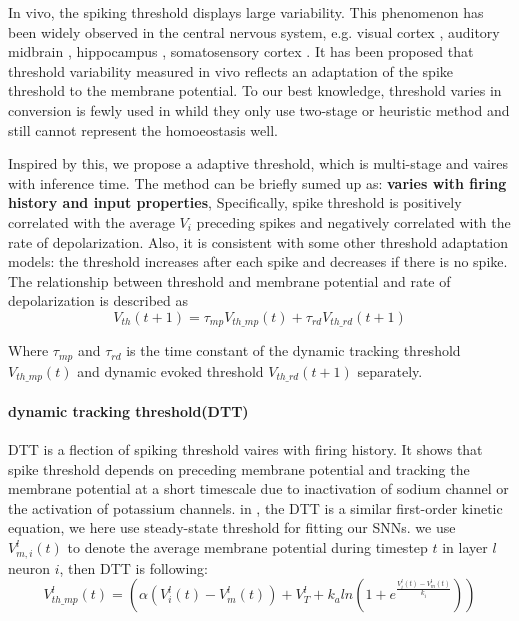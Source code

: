\documentclass{article}
\begin{document}
In vivo, the spiking threshold displays large variability. This phenomenon has been widely observed in
the central nervous system, e.g. visual cortex \cite{azouz2000dynamic, azouz2003adaptive}, auditory
midbrain \cite{pena2002postsynaptic}, hippocampus \cite{henze2001action}, somatosensory cortex \cite{wilent2005stimulus}. It has
been proposed that threshold variability measured in vivo reflects
an adaptation of the spike threshold to the membrane potential. To our best knowledge, threshold varies in conversion is fewly used in \cite{kim2020towards,chen2022adaptive,li2021free} whild they only use two-stage or heuristic method and still cannot represent the homoeostasis well.

Inspired by this, we propose a adaptive threshold, which is multi-stage and vaires with inference time.
The method can be briefly sumed up as: \textbf{varies with firing history and input properties},
Specifically, spike threshold is positively correlated with the average $V_i$ preceding spikes and negatively correlated with the rate of depolarization. Also, it is consistent with some
other threshold adaptation models: the threshold increases after each spike and decreases if there is no spike.
The relationship between threshold and membrane potential and rate of depolarization is described as
\begin{equation}
  V_{th}(t+1) = \tau_{mp}V_{th\_mp}(t) + \tau_{rd}V_{th\_rd}(t+1)
\end{equation}

Where $\tau_{mp}$ and $\tau_{rd}$ is the time constant of the dynamic tracking threshold $V_{th\_mp}(t)$ and dynamic evoked threshold $V_{th\_rd}(t+1)$ separately.

\paragraph{dynamic tracking threshold(DTT)} DTT is a flection of spiking threshold vaires with firing history. It shows that spike threshold depends on preceding membrane potential
and tracking the membrane potential at a short timescale due to inactivation of sodium channel\cite{kuba2010presynaptic, hu2009distinct, platkiewicz2011impact} or the activation of potassium channels\cite{higgs2011kv1, goldberg2008k}.
in \cite{fontaine2014spike}, the DTT is a similar first-order kinetic equation, we here use steady-state threshold for fitting our SNNs.
we use $V_{m,i}^l(t)$ to denote the average membrane potential during timestep $t$ in layer $l$ neuron $i$, then DTT is following:
\begin{equation}
  V_{th\_mp}^l(t) = \left(\alpha\left(V_i^l(t)-V_m^l(t)\right)+V_{T}^l+k_aln\left(1+e^{\frac{V_i^l(t)-V_m^l(t)}{k_i}}\right)\right)
\end{equation}
\end{document}
